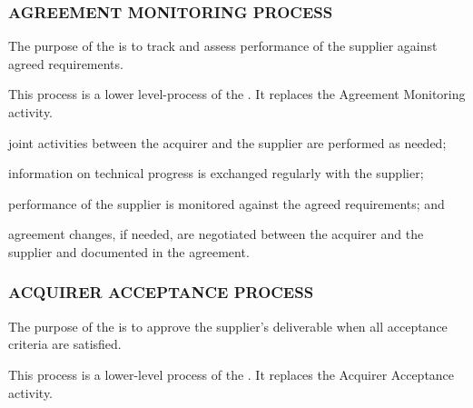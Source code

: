 		\subsubsection{AGREEMENT MONITORING PROCESS\label{llproc:agreement_monitoring_process}}

			\begin{adjustwidth}{2em}{0pt} 

				The purpose of the  is to track and assess performance of the supplier against agreed requirements.

				This process is a lower level-process of the . It replaces the Agreement Monitoring activity.

			\end{adjustwidth}

			\begin{adjustwidth}{2em}{0pt} 

				\begin{compactitem}

					\item joint activities between the acquirer and the supplier are performed as needed;

					\item information on technical progress is exchanged regularly with the supplier;

					\item performance of the supplier is monitored against the agreed requirements; and

					\item agreement changes, if needed, are negotiated between the acquirer and the supplier and documented in the agreement.

				\end{compactitem}

			\end{adjustwidth}

		\subsubsection{ACQUIRER ACCEPTANCE PROCESS\label{llproc:acquirer_acceptance_process}}

			\begin{adjustwidth}{2em}{0pt} 

				The purpose of the  is to approve the supplier's deliverable when all acceptance criteria are satisfied.

				This process is a lower-level process of the . It replaces the Acquirer Acceptance activity.

			\end{adjustwidth}

